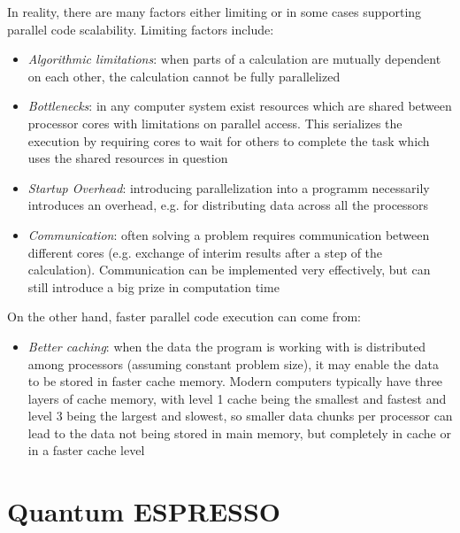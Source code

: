 \documentclass[main.tex]{subfiles}
\begin{document}
In reality, there are many factors either limiting or in some cases supporting parallel code scalability. Limiting factors include:
\begin{itemize}
    \item \emph{Algorithmic limitations}: when parts of a calculation are mutually dependent on each other, the calculation cannot be fully parallelized
    \item \emph{Bottlenecks}: in any computer system exist resources which are shared between processor cores with limitations on parallel access. This serializes the execution by requiring cores to wait for others to complete the task which uses the shared resources in question
    \item \emph{Startup Overhead}: introducing parallelization into a programm necessarily introduces an overhead, e.g. for distributing data across all the processors
    \item \emph{Communication}: often solving a problem requires communication between different cores (e.g. exchange of interim results after a step of the calculation). Communication can be implemented very effectively, but can still introduce a big prize in computation time
\end{itemize}
On the other hand, faster parallel code execution can come from:
\begin{itemize}
    \item \emph{Better caching}: when the data the program is working with is distributed among processors (assuming constant problem size), it may enable the data to be stored in faster cache memory. Modern computers typically have three layers of cache memory, with level 1 cache being the smallest and fastest and level 3 being the largest and slowest, so smaller data chunks per processor can lead to the data not being stored in main memory, but completely in cache or in a faster cache level
\end{itemize}

\section{Quantum ESPRESSO}\label{sec:qe}

\QE \cite{giannozzi_quantum_2009,giannozzi_advanced_2017}
\end{document}
